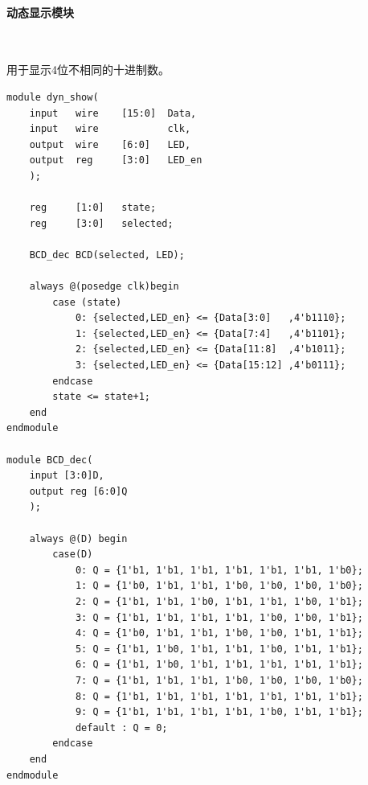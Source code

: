 \documentclass[UTF8]{ctexart}
\numberwithin{figure}{subsection}
\numberwithin{table}{subsection}
\numberwithin{equation}{subsection}
\begin{document}
\paragraph{动态显示模块}~
\par 用于显示4位不相同的十进制数。
\begin{lstlisting}[style={verilog-style}]
module dyn_show(
    input   wire    [15:0]  Data,
    input   wire            clk,
    output  wire    [6:0]   LED,
    output  reg     [3:0]   LED_en
    );

    reg     [1:0]   state;
    reg     [3:0]   selected;

    BCD_dec BCD(selected, LED);

    always @(posedge clk)begin
        case (state)
            0: {selected,LED_en} <= {Data[3:0]   ,4'b1110};
            1: {selected,LED_en} <= {Data[7:4]   ,4'b1101};
            2: {selected,LED_en} <= {Data[11:8]  ,4'b1011};
            3: {selected,LED_en} <= {Data[15:12] ,4'b0111};
        endcase
        state <= state+1;
    end
endmodule

module BCD_dec(
    input [3:0]D,
    output reg [6:0]Q
    );

    always @(D) begin
        case(D)
            0: Q = {1'b1, 1'b1, 1'b1, 1'b1, 1'b1, 1'b1, 1'b0};
            1: Q = {1'b0, 1'b1, 1'b1, 1'b0, 1'b0, 1'b0, 1'b0};
            2: Q = {1'b1, 1'b1, 1'b0, 1'b1, 1'b1, 1'b0, 1'b1};
            3: Q = {1'b1, 1'b1, 1'b1, 1'b1, 1'b0, 1'b0, 1'b1};
            4: Q = {1'b0, 1'b1, 1'b1, 1'b0, 1'b0, 1'b1, 1'b1};
            5: Q = {1'b1, 1'b0, 1'b1, 1'b1, 1'b0, 1'b1, 1'b1};
            6: Q = {1'b1, 1'b0, 1'b1, 1'b1, 1'b1, 1'b1, 1'b1};
            7: Q = {1'b1, 1'b1, 1'b1, 1'b0, 1'b0, 1'b0, 1'b0};
            8: Q = {1'b1, 1'b1, 1'b1, 1'b1, 1'b1, 1'b1, 1'b1};
            9: Q = {1'b1, 1'b1, 1'b1, 1'b1, 1'b0, 1'b1, 1'b1};
            default : Q = 0;
        endcase
    end
endmodule
\end{lstlisting}
\end{document}

